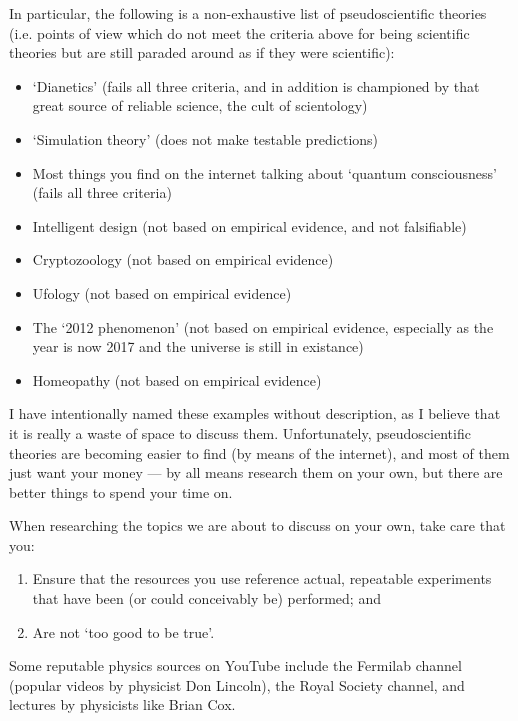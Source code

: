 \documentclass[a4paper]{amsbook}
\theoremstyle{definition}
\numberwithin{exercise}{chapter}
\numberwithin{exercise}{chapter}
\begin{document}
In particular, the following is a non-exhaustive list of pseudoscientific theories (i.e. points of view which do not meet the criteria
above for being scientific theories but are still paraded around as if they were scientific):
\begin{itemize}
  \item `Dianetics' (fails all three criteria, and in addition is championed by that great source of reliable science, the cult of scientology)
  \item `Simulation theory' (does not make testable predictions)
  \item Most things you find on the internet talking about `quantum consciousness' (fails all three criteria)
  \item Intelligent design (not based on empirical evidence, and not falsifiable)
  \item Cryptozoology (not based on empirical evidence)
  \item Ufology (not based on empirical evidence)
  \item The `2012 phenomenon' (not based on empirical evidence, especially as the year is now 2017 and the universe is still in existance)
  \item Homeopathy (not based on empirical evidence)
\end{itemize}
I have intentionally named these examples without description, as I believe that it is really a waste of space to discuss them. Unfortunately,
pseudoscientific theories are becoming easier to find (by means of the internet), and most of them just want your money --- by all means research
them on your own, but there are better things to spend your time on.

When researching the topics we are about to discuss on your own, take care that you:
\begin{enumerate}
  \item Ensure that the resources you use reference actual, repeatable experiments that have been (or could conceivably be) performed; and
  \item Are not `too good to be true'.
\end{enumerate}

Some reputable physics sources on YouTube include the Fermilab channel (popular videos by physicist Don Lincoln), the Royal Society channel, and
lectures by physicists like Brian Cox.
\end{document}
